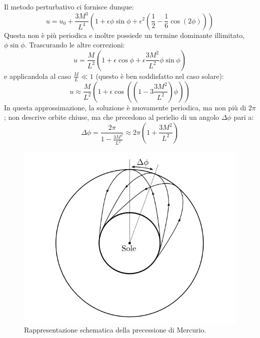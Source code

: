 Il metodo perturbativo ci fornisce dunque:
\begin{equation*}
     u = u_0 + \frac{3M^3}{L^4}\left(1 + \epsilon \phi \sin \phi + \epsilon^2(\frac{1}{2} -\frac{1}{6}\cos(2\phi) )\right)
\end{equation*}
Questa non è più periodica e inoltre possiede un termine dominante illimitato, $\phi\sin\phi$. Trascurando le altre correzioni:
\begin{equation*}
    u = \frac{M}{L^2}\left( 1+\epsilon\cos\phi + \epsilon\frac{3M^2}{L^2}\phi\sin\phi\right)
\end{equation*}
e applicandola al caso $\frac{M}{L} \ll 1$ (questo è ben soddisfatto nel caso solare):
\begin{equation}
    u \approx \frac{M}{L^2}\left( 1+\epsilon\cos((1-3\frac{3M^2}{L^2})\phi)\right)
\end{equation}
In questa approssimazione, la soluzione è nuovamente periodica, ma non più di $2\pi$; non descrive orbite chiuse, ma che precedono al perielio di un angolo $\Delta \phi$ pari a:
\begin{equation}
    \Delta \phi = \frac{2\pi}{1-\frac{3M^2}{L^2}} \approx 2\pi\left(1+\frac{3M^2}{L^2}\right)
    \label{eq.precessione}
\end{equation}
\begin{figure}
    \centering
    \includegraphics[scale=0.5]{immagini/precessione.png}
    \caption{Rappresentazione schematica della precessione di Mercurio.}
    \label{fig.precessione}
\end{figure}

